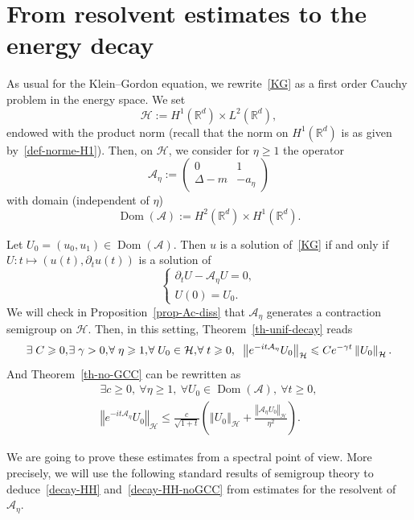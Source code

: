 \documentclass[AHL,Unicode,longabstracts]{cedram}
\newcommand{\nr}[1]{\left\Vert #1\right\Vert}
\renewcommand{\leq}{\leqslant}
\renewcommand{\geq}{\geqslant}
\newcommand{\1}{\mathds 1}
\DeclareMathOperator{\Dom}{Dom}
\newcommand{\R}{\mathbb{R}}
\newcommand{\g}{\gamma}
\newcommand{\D}{\Delta}
\newcommand{\Ac}{{\mathcal A}}
\newcommand{\HH}{\mathcal H}
\newcommand*{\Mk}{\mkern -2mu}
\let\oldexists\exists
\renewcommand*{\exists}{\mathrel{\oldexists}}
\let\oldforall\forall
\renewcommand*{\forall}{\mathrel{\oldforall}}
\begin{document}
\section{From resolvent estimates to the energy decay} \label{sec-resolvent-to-time}

As usual for the Klein--Gordon equation, we rewrite~\eqref{KG} as a first order Cauchy problem in the energy space. We set
\[
\HH := H^1(\R^d) \times L^2(\R^d),
\]
endowed with the product norm (recall that the norm on $H^1(\R^d)$ is as given by~\eqref{def-norme-H1}). Then, on $\HH$, we consider for $\eta \geq 1$ the operator
\[
\Ac_\eta :=
\begin{pmatrix}
0 & 1 \\
\D - m & -a_\eta
\end{pmatrix}
\]
with domain (independent of $\eta$)
\[
\Dom(\Ac) := H^2(\R^d) \times H^1(\R^d).
\]

Let $U_0 = (u_0,u_1) \in \Dom(\Ac)$. Then $u$ is a solution of~\eqref{KG} if and only if $U : t \mapsto (u(t),\partial_t u(t))$ is a solution of
\begin{equation}\label{KG-Ac}
\begin{cases}
\partial_t U - \Ac_\eta U = 0,\\
U(0) = U_0.
\end{cases}
\end{equation}
We will check in Proposition~\ref{prop-Ac-diss} that $\Ac_\eta$ generates a contraction semigroup on $\HH$. Then, in this setting, Theorem~\ref{th-unif-decay} reads
\begin{equation}\label{decay-HH}
\exists C \geq 0,\Mk \exists \gamma > 0,\Mk \forall \eta \geq 1,\Mk \forall U_0 \in \HH,\Mk \forall t \geq 0, \;\; \nr{e^{-it\Ac_\eta} U_0}_{\HH} \leq C e^{-\g t} \nr{U_0}_{\HH}.
\end{equation}
And Theorem~\ref{th-no-GCC} can be rewritten as
\begin{multline}\label{decay-HH-noGCC}
\exists c \geq 0,\ \forall \eta \geq 1,\ \forall U_0 \in \Dom(\Ac),\ \forall t \geq 0,
\\ \nr{e^{-it\Ac_\eta} U_0}_{\HH} \leq \frac c {\sqrt{1+t}} \left(\nr{U_0}_\HH + \frac {\nr{\Ac_\eta U_0}_{\HH}}{\eta^2} \right).
\end{multline}

We are going to prove these estimates from a spectral point of view. More precisely, we will use the following standard results of semigroup theory to deduce~\eqref{decay-HH} and~\eqref{decay-HH-noGCC} from estimates for the resolvent of $\Ac_\eta$.
\end{document}
